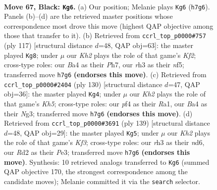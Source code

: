 \documentclass[11pt]{article}
\begin{document}
\clearpage

\begin{figure}[p]\centering
\begin{subfigure}{0.46\textwidth}\centering
\resizebox{\linewidth}{!}{%
\newchessgame
\chessboard[
  setfen={6n1/pR5k/P6p/1P3p2/b4P2/7R/3r4/4b1K1 b - - 4 67},
  showmover=false,
  pgfstyle=straightmove, color=movearrow, markmove={h7-g6}
]}
\caption{}
\end{subfigure}\hfill
\begin{subfigure}{0.46\textwidth}\centering
\resizebox{\linewidth}{!}{%
\newchessgame
\chessboard[
  setfen={8/R4k1p/p3np2/5N2/P2p2P1/7P/4K3/7r b - - 7 59},
  showmover=false,
  pgfstyle=straightmove, color=movearrow, markmove={f7-g8}
]}
\caption{}
\end{subfigure}
\\[4pt]
\begin{subfigure}{0.46\textwidth}\centering
\resizebox{\linewidth}{!}{%
\newchessgame
\chessboard[
  setfen={3b4/5p1k/3p4/p2Pr2K/Bp5P/6N1/8/R7 w - - 1 66},
  showmover=false,
  pgfstyle=straightmove, color=movearrow, markmove={h5-g4}
]}
\caption{}
\end{subfigure}\hfill
\begin{subfigure}{0.46\textwidth}\centering
\resizebox{\linewidth}{!}{%
\newchessgame
\chessboard[
  setfen={8/8/P2N1k1R/2p1n3/6p1/2P1p1P1/r6P/4K3 b - - 9 70},
  showmover=false,
  pgfstyle=straightmove, color=movearrow, markmove={f6-g5}
]}
\caption{}
\end{subfigure}
\caption{\textbf{Move 67, Black: \texttt{Kg6}.} (a) Our position; Melanie plays \texttt{Kg6} (\texttt{h7g6}). Panels (b)--(d) are the retrieved master positions whose correspondence most drove this move (highest QAP objective among those that transfer to it). (b) Retrieved from \texttt{ccrl\_top\_p0000\#757} (ply 117) [structural distance $d$=48, QAP obj=63]: the master played \texttt{Kg8}; under $\mu$ our \emph{Kh2} plays the role of that game's \emph{Kf2}; cross-type roles: our \emph{B}a4 as their \emph{P}h7, our \emph{r}h3 as their \emph{n}f5; transferred move \texttt{h7g6} \textbf{(endorses this move)}. (c) Retrieved from \texttt{ccrl\_top\_p0000\#2404} (ply 130) [structural distance $d$=47, QAP obj=36]: the master played \texttt{Kg4}; under $\mu$ our \emph{Kh2} plays the role of that game's \emph{Kh5}; cross-type roles: our \emph{p}f4 as their \emph{R}a1, our \emph{B}a4 as their \emph{N}g3; transferred move \texttt{h7g6} \textbf{(endorses this move)}. (d) Retrieved from \texttt{ccrl\_top\_p0000\#3691} (ply 139) [structural distance $d$=48, QAP obj=29]: the master played \texttt{Kg5}; under $\mu$ our \emph{Kh2} plays the role of that game's \emph{Kf3}; cross-type roles: our \emph{r}h3 as their \emph{n}d6, our \emph{R}d2 as their \emph{P}e3; transferred move \texttt{h7g6} \textbf{(endorses this move)}. Synthesis: 10 retrieved analogs transferred to \texttt{Kg6} (summed QAP objective 170, the strongest correspondence among the candidate moves); Melanie committed it via the \texttt{search} selector.}
\label{fig:thought-m133}
\end{figure}
\end{document}
